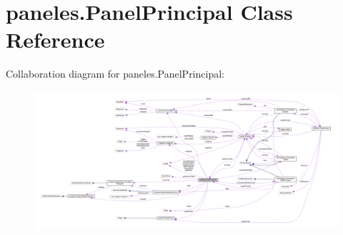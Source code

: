 \hypertarget{classpaneles_1_1_panel_principal}{}\section{paneles.\+Panel\+Principal Class Reference}
\label{classpaneles_1_1_panel_principal}


Collaboration diagram for paneles.\+Panel\+Principal\+:
\nopagebreak
\begin{figure}[H]
\begin{center}
\leavevmode
\includegraphics[width=350pt]{classpaneles_1_1_panel_principal__coll__graph}
\end{center}
\end{figure}

